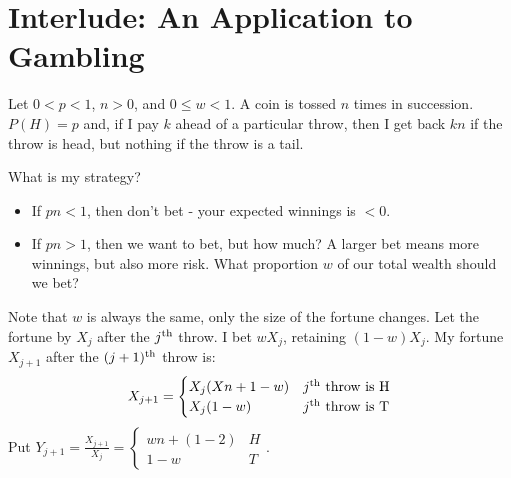 \documentclass[10pt,a4paper]{article}
\begin{document}
\section{Interlude: An Application to Gambling}
Let $0 < p < 1$, $n>0$, and $0 \leq w <1$. A coin is tossed $n$ times in succession. $P(H) = p$ and, if I pay $k$ ahead of a particular throw, then I get back $kn$ if the throw is head, but nothing if the throw is a tail.

What is my strategy?
\begin{itemize}
\item If $pn <1$, then don't bet - your expected winnings is $<0$.
\item If $pn >1$, then we want to bet, but how much? A larger bet means more winnings, but also more risk. What proportion $w$ of our total wealth should we bet?
\end{itemize}
Note that $w$ is always the same, only the size of the fortune changes. Let the fortune by $X_j$ after the $j\textsuperscript{th}$ throw. I bet $wX_j$, retaining $(1-w)X_j$. My fortune $X_{j+1}$ after the $(j+1)\textsuperscript{th}$ throw is:
\begin{align*}
X_{j+1} = \begin{cases} X_j(Xn + 1-w) & j\textsuperscript{th} \text{ throw is H}\\X_j(1-w) & j\textsuperscript{th}\text{ throw is T}\end{cases}
\end{align*}
Put $Y_{j+1} = \frac{X_{j+1}}{X_j} = \begin{cases} wn + (1-2) & H \\ 1-w & T\end{cases}$.
\end{document}
